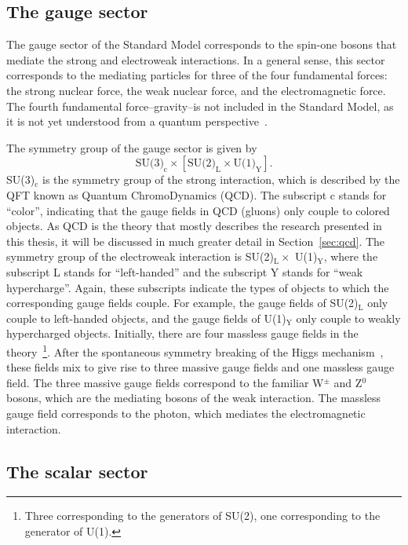 \subsection{The gauge sector}
\label{sec:gauge_fields}

The gauge sector of the Standard Model corresponds to the spin-one bosons that mediate the strong and electroweak interactions. In a general sense, this sector corresponds to the mediating particles for three of the four fundamental forces: the strong nuclear force, the weak nuclear force, and the electromagnetic force. The fourth fundamental force--gravity--is not included in the Standard Model, as it is not yet understood from a quantum perspective~\cite{QuantumGravity}.

The symmetry group of the gauge sector is given by
%
\begin{equation}
    \label{eq:gauge_symmetry}
    \text{SU(3)}_\text{c} \times \left[\text{SU(2)}_\text{L} \times \text{U(1)}_\text{Y}\right].
\end{equation}
%
SU(3)$_\text{c}$ is the symmetry group of the strong interaction, which is described by the QFT known as Quantum ChromoDynamics (QCD). The subscript c stands for ``color'', indicating that the gauge fields in QCD (gluons) only couple to colored objects. As QCD is the theory that mostly describes the research presented in this thesis, it will be discussed in much greater detail in Section~\ref{sec:qcd}. The symmetry group of the electroweak interaction is SU(2)$_\text{L} \times$ U(1)$_\text{Y}$, where the subscript L stands for ``left-handed'' and the subscript Y stands for ``weak hypercharge''. Again, these subscripts indicate the types of objects to which the corresponding gauge fields couple. For example, the gauge fields of SU(2)$_\text{L}$ only couple to left-handed objects, and the gauge fields of U(1)$_\text{Y}$ only couple to weakly hypercharged objects. Initially, there are four massless gauge fields in the theory~\footnote{Three corresponding to the generators of SU(2), one corresponding to the generator of U(1).}. After the spontaneous symmetry breaking of the Higgs mechanism~\cite{HiggsPaper}, these fields mix to give rise to three massive gauge fields and one massless gauge field. The three massive gauge fields correspond to the familiar W$^{\pm}$ and Z$^{0}$ bosons, which are the mediating bosons of the weak interaction. The massless gauge field corresponds to the photon, which mediates the electromagnetic interaction.

\subsection{The scalar sector}
\label{sec:scalar_fields}

